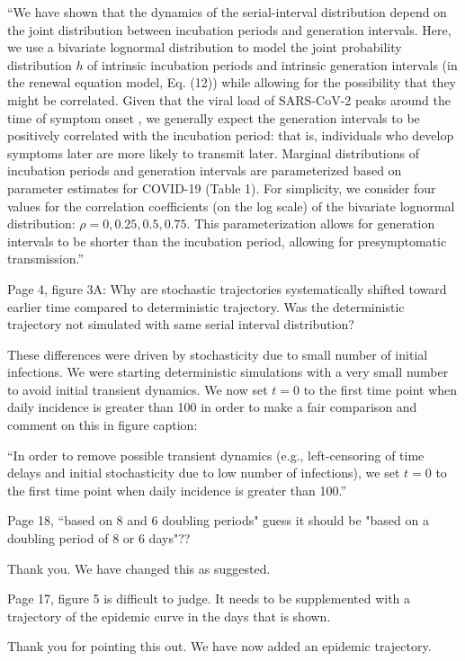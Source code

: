 \documentclass[12pt]{article}
\newcommand{\revtext}{\textsf}
\begin{document}
``We have shown that the dynamics of the serial-interval distribution depend on the joint distribution between incubation periods and generation intervals.
Here, we use a bivariate lognormal distribution to model the joint probability distribution $h$ of intrinsic incubation periods and intrinsic generation intervals (in the renewal equation model, Eq. (12)) while allowing for the possibility that they might be correlated.
Given that the viral load of SARS-CoV-2 peaks around the time of symptom onset \citep{he2020temporal}, we generally expect the generation intervals to be positively correlated with the incubation period:
that is, individuals who develop symptoms later are more likely to transmit later.
Marginal distributions of incubation periods and generation intervals are parameterized based on parameter estimates for COVID-19 (Table 1).
For simplicity, we consider four values for the correlation coefficients (on the log scale) of the bivariate lognormal distribution: $\rho = 0, 0.25, 0.5, 0.75$.
This parameterization allows for generation intervals to be shorter than the incubation period, allowing for presymptomatic transmission.''

\revtext{Page 4, figure 3A: Why are stochastic trajectories systematically shifted toward earlier time compared to deterministic trajectory. Was the deterministic trajectory not simulated with same serial interval distribution?}

These differences were driven by stochasticity due to small number of initial infections. We were starting deterministic simulations with a very small number to avoid initial transient dynamics.
We now set $t=0$ to the first time point when daily incidence is greater than 100 in order to make a fair comparison and comment on this in figure caption:

``In order to remove possible transient dynamics (e.g., left-censoring of time delays and initial stochasticity due to low number of infections), we set $t=0$ to the first time point when daily incidence is greater than 100.''

\revtext{Page 18, ``based on 8 and 6 doubling periods" guess it should be "based on a doubling period of 8 or 6 days"??}

Thank you. We have changed this as suggested.

\revtext{Page 17, figure 5 is difficult to judge. It needs to be supplemented with a trajectory of the epidemic curve in the days that is shown.}

Thank you for pointing this out. We have now added an epidemic trajectory.
\end{document}
